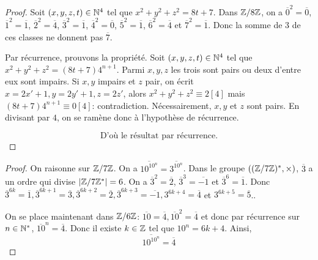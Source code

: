 \begin{proof}
	Soit $(x,y,z,t)\in\mathbb{N}^{4}$ tel que $x^{2}+y^{2}+z^{2}=8t+7$. Dans $\mathbb{Z}/8\mathbb{Z}$, on a $\overline{0}^{2}=\overline{0}$, $\overline{1}^{2}=\overline{1}$, $\overline{2}^{2}=\overline{4}$, $\overline{3}^{2}=\overline{1}$, $\overline{4}^{2}=\overline{0}$, $\overline{5}^{2}=\overline{1}$, $\overline{6}^{2}=\overline{4}$ et $\overline{7}^{2}=\overline{1}$. Donc la somme de 3 de ces classes ne donnent pas $\overline{7}$.

	Par récurrence, prouvons la propriété. Soit $(x,y,z,t)\in\mathbb{N}^{4}$ tel que $x^{2}+y^{2}+z^{2}=(8t+7)4^{n+1}$. Parmi $x,y,z$ les trois sont pairs ou deux d'entre eux sont impairs. Si $x,y$ impairs et $z$ pair, on écrit $x=2x'+1,y=2y'+1,z=2z'$, alors $x^{2}+y^{2}+z^{2}\equiv 2[4]$ mais $(8t+7)4^{n+1}\equiv 0[4]$: contradiction. Nécessairement, $x,y$ et $z$ sont pairs. En divisant par $4$, on se ramène donc à l'hypothèse de récurrence.

	\begin{equation}
		\boxed{\text{D'où le résultat par récurrence.}}
	\end{equation}
\end{proof}

\begin{proof}
	On raisonne sur $\mathbb{Z}/7\mathbb{Z}$. On a $\overline{10^{10^{n}}}=\overline{3^{10^{n}}}$. Dans le groupe $((\mathbb{Z}/7\mathbb{Z})^{*},\times)$, $\overline{3}$ a un ordre qui divise $\vert \mathbb{Z}/7\mathbb{Z}^{*}\vert=6$. On a $\overline{3}^{2}=\overline{2}$, $\overline{3}^{3}=\overline{-1}$ et $\overline{3}^{6}=\overline{1}$. Donc $\overline{3}^{6k}=\overline{1}, \overline{3}^{6k+1}=\overline{3},\overline{3}^{6k+2}=\overline{2},\overline{3}^{6k+3}=\overline{-1}, 3^{6k+4}=\overline{4}$ et $3^{6k+5}=\overline{5}$..

	On se place maintenant dans $\mathbb{Z}/6\mathbb{Z}$: $\overline{10}=\overline{4},\overline{10}^{2}=\overline{4}$ et donc par récurrence sur $n\in\mathbb{N}^{*}$, $\overline{10}^{n}=\overline{4}$. Donc il existe $k\in\mathbb{Z}$ tel que $10^{n}=6k+4$. Ainsi, \begin{equation}
		\boxed{\overline{10^{10^{n}}}=\overline{4}}
	\end{equation}
\end{proof}

